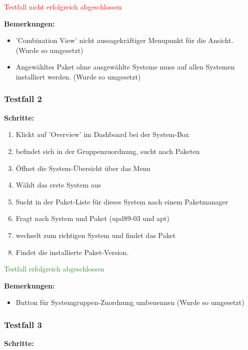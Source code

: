 \textcolor{Red}{Testfall nicht erfolgreich abgeschlossen}

\bigskip
\textbf{Bemerkungen:}

\begin{itemize}[noitemsep,nolistsep]
    \item 'Combination View' nicht aussagekräftiger Menupunkt für die Ansicht. (Wurde so umgesetzt)
    \item Angewähltes Paket ohne ausgewählte Systeme muss auf allen Systemen installiert werden. (Wurde so umgesetzt)
\end{itemize}


\subsubsection*{Testfall 2}

\textbf{Schritte:}

\begin{enumerate}
    \item Klickt auf 'Overview' im Dashboard bei der System-Box
    \item befindet sich in der Gruppenzuordnung, sucht nach Paketen
    \item Öffnet die System-Übersicht über das Menu
    \item Wählt das erste System aus
    \item Sucht in der Paket-Liste für dieses System nach einem Paketmanager
    \item Fragt nach System und Paket (upd89-03 und apt)
    \item wechselt zum richtigen System und findet das Paket
    \item Findet die installierte Paket-Version.
\end{enumerate}

\textcolor{ForestGreen}{Testfall erfolgreich abgeschlossen}

\bigskip
\textbf{Bemerkungen:}

\begin{itemize}[noitemsep,nolistsep]
    \item Button für Systemgruppen-Zuordnung umbenennen (Wurde so umgesetzt)
\end{itemize}


\subsubsection*{Testfall 3}

\textbf{Schritte:}

